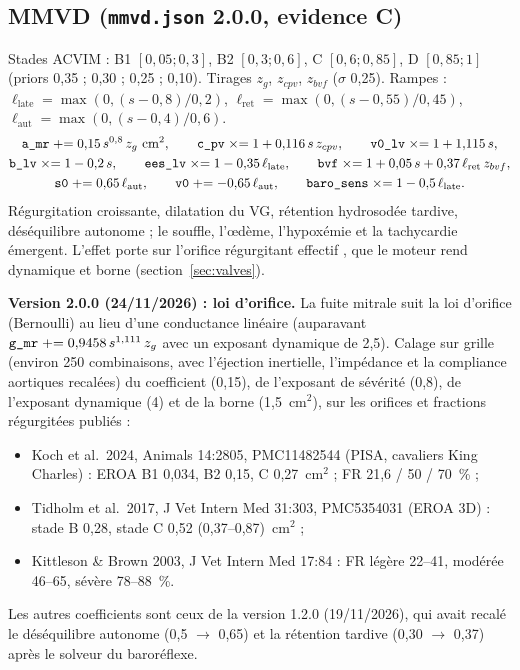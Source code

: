 \documentclass[10pt,a4paper]{article}
\newcommand{\cmd}[1]{\texttt{#1}}
\newcommand{\vp}[1]{\text{\texttt{\detokenize{#1}}}}
\begin{document}
\subsection{MMVD (\cmd{mmvd.json} 2.0.0, evidence C)}\label{sec:mmvd}
Stades ACVIM : B1 $[0{,}05; 0{,}3]$, B2 $[0{,}3; 0{,}6]$, C $[0{,}6; 0{,}85]$, D $[0{,}85; 1]$ (priors 0,35 ; 0,30 ; 0,25 ; 0,10). Tirages $z_g$, $z_{cpv}$, $z_{bvf}$ ($\sigma$ 0,25). Rampes : $\ell_\text{late} = \max(0, (s - 0{,}8)/0{,}2)$, $\ell_\text{ret} = \max(0, (s - 0{,}55)/0{,}45)$, $\ell_\text{aut} = \max(0, (s - 0{,}4)/0{,}6)$.
\begin{gather}
\vp{a_mr} \mathrel{+}= 0{,}15\,s^{0{,}8}\,z_g~\text{cm}^2,\qquad \vp{c_pv} \mathrel{\times}= 1 + 0{,}116\,s\,z_{cpv},\qquad \vp{v0_lv} \mathrel{\times}= 1 + 1{,}115\,s,\\
\vp{b_lv} \mathrel{\times}= 1 - 0{,}2\,s,\qquad \vp{ees_lv} \mathrel{\times}= 1 - 0{,}35\,\ell_\text{late},\qquad \vp{bvf} \mathrel{\times}= 1 + 0{,}05\,s + 0{,}37\,\ell_\text{ret}\,z_{bvf},\\
\vp{s0} \mathrel{+}= 0{,}65\,\ell_\text{aut},\qquad \vp{v0} \mathrel{+}= -0{,}65\,\ell_\text{aut},\qquad \vp{baro_sens} \mathrel{\times}= 1 - 0{,}5\,\ell_\text{late}.
\end{gather}
Régurgitation croissante, dilatation du VG, rétention hydrosodée tardive, déséquilibre autonome ; le souffle, l'œdème, l'hypoxémie et la tachycardie émergent. L'effet porte sur l'orifice régurgitant effectif \vp{a_mr}, que le moteur rend dynamique et borne (section~\ref{sec:valves}).

\textbf{Version 2.0.0 (24/11/2026) : loi d'orifice.} La fuite mitrale suit la loi d'orifice (Bernoulli) au lieu d'une conductance linéaire (auparavant $\vp{g_mr} \mathrel{+}= 0{,}9458\,s^{1{,}111}\,z_g$ avec un exposant dynamique de 2,5). Calage sur grille (environ 250 combinaisons, avec l'éjection inertielle, l'impédance et la compliance aortiques recalées) du coefficient (0,15), de l'exposant de sévérité (0,8), de l'exposant dynamique (4) et de la borne (1,5~cm$^2$), sur les orifices et fractions régurgitées publiés :
\begin{itemize}
\item Koch et al.\ 2024, Animals 14:2805, PMC11482544 (PISA, cavaliers King Charles) : EROA B1 0,034, B2 0,15, C 0,27~cm$^2$ ; FR 21,6 / 50 / 70~\% ;
\item Tidholm et al.\ 2017, J Vet Intern Med 31:303, PMC5354031 (EROA 3D) : stade B 0,28, stade C 0,52 (0,37--0,87)~cm$^2$ ;
\item Kittleson \& Brown 2003, J Vet Intern Med 17:84 : FR légère 22--41, modérée 46--65, sévère 78--88~\%.
\end{itemize}
Les autres coefficients sont ceux de la version 1.2.0 (19/11/2026), qui avait recalé le déséquilibre autonome (0,5 $\to$ 0,65) et la rétention tardive (0,30 $\to$ 0,37) après le solveur du baroréflexe.
\end{document}
